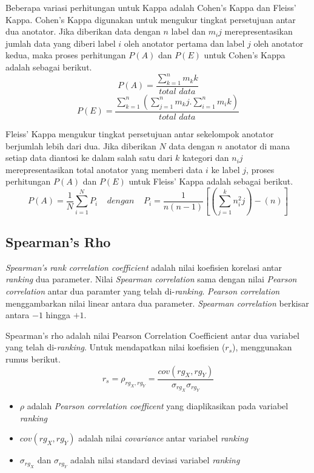 Beberapa variasi perhitungan untuk Kappa adalah Cohen's Kappa dan Fleiss' Kappa. Cohen's Kappa digunakan untuk mengukur tingkat persetujuan antar dua anotator. Jika diberikan data dengan $n$ label dan $m_ij$ merepresentasikan jumlah data yang diberi label $i$ oleh anotator pertama dan label $j$ oleh anotator kedua, maka proses perhitungan $P(A)$ dan $P(E)$ untuk Cohen's Kappa adalah sebagai berikut.
\[ P(A)=\frac{\sum_{k=1}^{n} m_kk}{total\,\,data} \]
\[ P(E)=\frac{\sum_{k=1}^{n} ( \sum_{j=1}^{n} m_kj . \sum_{i=1}^{n} m_ik ) }{total\,\,data} \]

Fleiss' Kappa mengukur tingkat persetujuan antar sekelompok anotator berjumlah lebih dari dua. Jika diberikan $N$ data dengan $n$ anotator di mana setiap data diantosi ke dalam salah satu dari $k$ kategori dan $n_ij$ merepresentasikan total anotator yang memberi data $i$ ke label $j$, proses perhitungan $P(A)$ dan $P(E)$ untuk Fleiss' Kappa adalah sebagai berikut.
\[ P(A)=\frac{1}{N}\sum_{i=1}^{N}P_i \:\:\:\:\:dengan\:\:\:\:\: P_i=\frac{1}{n(n-1)}[(\sum_{j=1}^{k}n^2_ij)-(n)] \]

\subsection{Spearman's Rho}
\textit{Spearman's rank correlation coefficient} adalah nilai koefisien korelasi antar \textit{ranking} dua parameter. Nilai \textit{Spearman correlation} sama dengan nilai \textit{Pearson correlation} antar dua paramter yang telah di-\textit{ranking}. \textit{Pearson correlation}  menggambarkan nilai linear antara dua parameter. \textit{Spearman correlation} berkisar antara $-1$ hingga $+1$.

Spearman's rho adalah nilai Pearson Correlation Coefficient antar dua variabel yang telah di-\textit{ranking}. Untuk mendapatkan nilai koefisien ($r_s$), menggunakan rumus berikut.
\begin{equation}
r_s = \rho_{rg_X,rg_Y} = \frac{cov(rg_X,rg_Y)}{\sigma_{rg_X}\sigma_{rg_Y}}
\end{equation}
\begin{itemize}
  \item $\rho$ adalah \textit{Pearson correlation coefficent} yang diaplikasikan pada variabel \textit{ranking}
  \item $cov(rg_X,rg_Y)$ adalah nilai \textit{covariance} antar variabel \textit{ranking}
  \item $\sigma_{rg_X}$ dan $\sigma_{rg_Y}$ adalah nilai standard deviasi variabel \textit{ranking}
\end{itemize}

